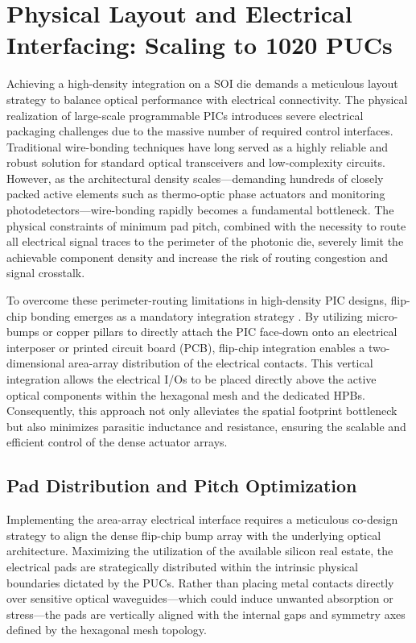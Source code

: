 \section{Physical Layout and Electrical Interfacing: Scaling to 1020 PUCs}
\label{sec:physical_layout}

Achieving a high-density integration on a SOI die demands a meticulous layout strategy to balance 
optical performance with electrical connectivity. 
The physical realization of large-scale programmable PICs introduces severe electrical packaging 
challenges due to the massive number of required control interfaces. Traditional wire-bonding 
techniques have long served as a highly reliable and robust solution for standard optical 
transceivers and low-complexity circuits. However, as the architectural density scales---demanding 
hundreds of closely packed active elements such as thermo-optic phase actuators and monitoring 
photodetectors---wire-bonding rapidly becomes a fundamental bottleneck. The physical constraints 
of minimum pad pitch, combined with the necessity to route all electrical signal traces to the 
perimeter of the photonic die, severely limit the achievable component density and increase the 
risk of routing congestion and signal crosstalk.

To overcome these perimeter-routing limitations in high-density PIC designs, flip-chip bonding
emerges as a mandatory integration strategy \cite{tummalaFundamentalsMicrosystemsPackaging2001, 
carrollPhotonicPackagingTransforming2016}. By utilizing micro-bumps or copper pillars to directly 
attach the PIC face-down onto an electrical interposer or printed circuit board (PCB), flip-chip 
integration enables a two-dimensional area-array distribution of the electrical contacts. This 
vertical integration allows the electrical I/Os to be placed directly above the active optical 
components within the hexagonal mesh and the dedicated HPBs. Consequently, this approach not only 
alleviates the spatial footprint bottleneck but also minimizes parasitic inductance and resistance, 
ensuring the scalable and efficient control of the dense actuator arrays.


\subsection{Pad Distribution and Pitch Optimization}
\label{subsubsec:pad_distribution}

Implementing the area-array electrical interface requires a meticulous co-design strategy to align 
the dense flip-chip bump array with the underlying optical architecture. Maximizing the utilization 
of the available silicon real estate, the electrical pads are strategically distributed within the 
intrinsic physical boundaries dictated by the PUCs. Rather than placing metal contacts directly 
over sensitive optical waveguides—which could induce unwanted absorption or stress—the pads are 
vertically aligned with the internal gaps and symmetry axes defined by the hexagonal mesh topology.

